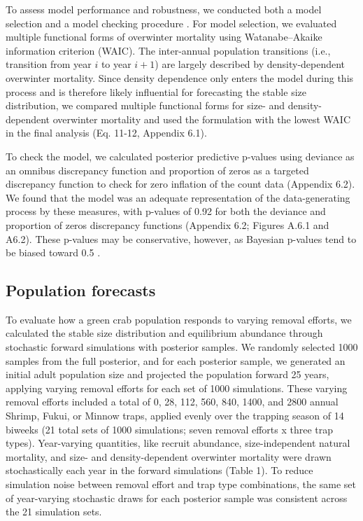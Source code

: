 \documentclass{article}
\begin{document}
To assess model performance and robustness, we conducted both a model selection and a model checking procedure \parencite{conn2018guide}. For model selection, we evaluated multiple functional forms of overwinter mortality using Watanabe–Akaike information criterion (WAIC). The inter-annual population transitions (i.e., transition from year $i$ to year $i + 1$) are largely described by density-dependent overwinter mortality. Since density dependence only enters the model during this process and is therefore likely influential for forecasting the stable size distribution, we compared multiple functional forms for size- and density-dependent overwinter mortality and used the formulation with the lowest WAIC in the final analysis (Eq. 11-12, Appendix 6.1).

To check the model, we calculated posterior predictive p-values using deviance as an omnibus discrepancy function and proportion of zeros as a targeted discrepancy function to check for zero inflation of the count data (Appendix 6.2). We found that the model was an adequate representation of the data-generating process by these measures, with p-values of 0.92 for both the deviance and proportion of zeros discrepancy functions (Appendix 6.2; Figures A.6.1 and A6.2). These p-values may be conservative, however, as Bayesian p-values tend to be biased toward 0.5 \parencite{conn2018guide}.


\subsection{Population forecasts}

To evaluate how a green crab population responds to varying removal efforts, we calculated the stable size distribution and equilibrium abundance through stochastic forward simulations with posterior samples. We randomly selected 1000 samples from the full posterior, and for each posterior sample, we generated an initial adult population size and projected the population forward 25 years, applying varying removal efforts for each set of 1000 simulations. These varying removal efforts included a total of 0, 28, 112, 560, 840, 1400, and 2800 annual Shrimp, Fukui, or Minnow traps, applied evenly over the trapping season of 14 biweeks (21 total sets of 1000 simulations; seven removal efforts x three trap types). Year-varying quantities, like recruit abundance, size-independent natural mortality, and size- and density-dependent overwinter mortality were drawn stochastically each year in the forward simulations (Table 1). To reduce simulation noise between removal effort and trap type combinations, the same set of year-varying stochastic draws for each posterior sample was consistent across the 21 simulation sets. 
\end{document}
